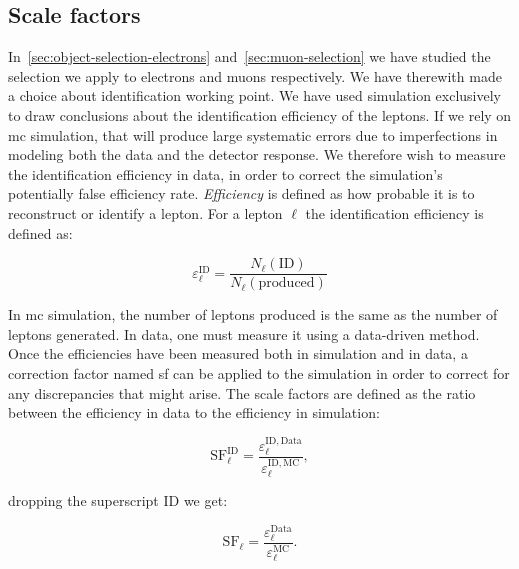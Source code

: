 \clearpage

\subsection{Scale factors}

In~\ref{sec:object-selection-electrons} and~\ref{sec:muon-selection} we have studied the selection we apply to electrons and muons respectively. We have therewith made a choice about identification working point. We have used simulation exclusively to draw conclusions about the identification efficiency of the leptons. If we rely on \gls{mc} simulation,  that will produce large systematic errors due to imperfections in modeling both the data and the detector response. We therefore wish to measure the identification efficiency in data, in order to correct the simulation's potentially false efficiency rate. \emph{Efficiency} is defined as how probable it is to reconstruct or identify a lepton. For a lepton $\ell$ the identification efficiency is defined as:

\begin{equation}
\varepsilon_{\ell}^{\mathrm{ID}} = \frac{N_{\ell}(\mathrm{ID})}{N_{\ell}(\mathrm{produced})}
\end{equation}

In \gls{mc} simulation, the number of leptons produced is the same as the number of leptons generated. In data, one must measure it using a data-driven method. Once the efficiencies have been measured both in simulation and in data, a correction factor named \gls{sf} can be applied to the simulation in order to correct for any discrepancies that might arise. The scale factors are defined as the ratio between the efficiency in data to the efficiency in simulation:

\begin{equation}
\mathrm{SF}_{\ell}^{\mathrm{ID}}=\frac{\varepsilon_{\ell}^{\mathrm{ID,Data}}}{\varepsilon_{\ell}^{\mathrm{ID,MC}}},
\end{equation}

dropping the superscript ID we get:

\begin{equation}
\mathrm{SF}_{\ell}=\frac{\varepsilon_{\ell}^{\mathrm{Data}}}{\varepsilon_{\ell}^{\mathrm{MC}}}.
\end{equation}

